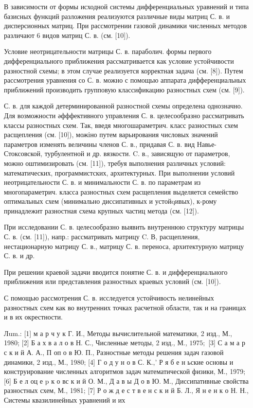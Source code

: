 \documentclass[10pt]{article}
\begin{document}
В зависимости от формы исходной системы дифференциальных уравнений и типа базисных функций разложения реализуются различные виды матриц С. в. и дисперсионных матриц. При рассмотрении газовой динамики численных методов различают 6 видов матриц С. в. (см. [10]).



Условие неотрицательности матрицы С. в. параболич. формы первого дифференциального приближения рассматривается как условие устойчивости разностной схемы; в этом случае реализуется корректная задача (см. [8]). Путем рассмотрения уравнения со С. в. можно с помощью аппарата дифференциальных приближений производить групповую классификацию разностных схем (см. [9]).



С. в. для каждой детерминированной разностной схемы определена однозначно. Для возможности әфффективного управления С. в. целесообразно рассматривать классы разностных схем. Так, введя многошараметрич. класс разностных схем расщепления (см. [10]), можіно путем варьирования числовых значений параметров изменять величины членов С. в., придавая С. в. вид Навье-Стоксовской, турбулентной и др. вязкости. C. в., зависящую от параметров, можно оштимизировать (см. [11]), требуя выполнения различных условий: математических, программистских, архитектурных. При выполнении условий неотрицательности С. в. и минимальности С. в. по параметрам из многопараметрич. класса разностных схем расщепления выделяется семейство оптимальных схем (минимально диссипативных и устойqивых), к-рому принадлежит разностная схема крупных частиц метода (см. [12]).



При исследовании С. в. целесообразно выявить внутреннюю структуру матрицы С. в. (см. [11]), напр.: рассматривать матрицу $\mathrm{C}$. В, расщепления, нестационарную матрицу С. в., матрицу С. в. переноса, архитектурную матрицу С. в. и др.



При решении краевой задачи вводится понятие С. в. и дифференциального приближения или представления разностных краевых условий (см. [10]).



С помощью рассмотрения С. в. исследуется устойчивость нелинейных разностных схем как во внутренних точках расчетной области, так и на границах и в их окрестности.



Лum.: [1] м а р ч у к Г. И., Методы вычислительной математики, 2 изд., М., 1980; [2] Б а х в а л о в Н. С., Численные методы, 2 изд., М., $1975 ;$ [3] С а м а р с к и й А. А., П оп о в Ю. П., Разностные методы решения задач газовой динамики, 2 изд., М., 1980; [4] Г о д у н о в С. К.,' Р я б е н ьские основы и конструирование численных алгоритмов задач математической физики, М., 1979; [6] Б е л оц е p к о вс к и й О. М., Д а в ы Д о в Ю. М., Диссипативные свойства разностных схем, М., 1981; [7] Р о ж д е с т в е н с к и й Б. Л., Я н е н к о Н. Н., Системы квазилинейных уравнений и их
\end{document}
